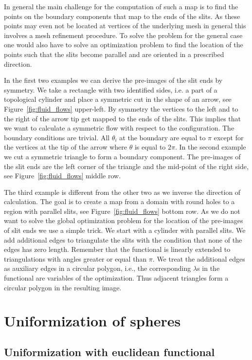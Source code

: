 \documentclass[Thesis.tex]{subfiles}
\begin{document}
In general the main challenge for the computation of such a map is to find the points on the boundary components that map to the ends of the slits. As these points may even not be located at vertices of the underlying mesh in general this involves a mesh refinement procedure. To solve the problem for the general case one would also have to solve an optimization problem to find the location of the points such that the slits become parallel and are oriented in a prescribed direction.

In the first two examples we can derive the pre-images of the slit ends by symmetry. 
We take a rectangle with two identified sides, i.e. a part of a topological cylinder and place a symmetric cut in the shape of an arrow, see Figure~\ref{fig:fluid_flows} upper-left. 
By symmetry the vertices to the left and to the right of the arrow tip get mapped to the ends of the slits. 
This implies that we want to calculate a symmetric flow with respect to the configuration.
The boundary conditions are trivial. 
All $\theta_i$ at the boundary are equal to $\pi$ except for the vertices at the tip of the arrow where $\theta$ is equal to $2\pi$.
In the second example we cut a symmetric triangle to form a boundary component. The pre-images of the slit ends are the left corner of the triangle and the mid-point of the right side, see Figure~\ref{fig:fluid_flows} middle row.

The third example is different from the other two as we inverse the direction of calculation. 
The goal is to create a map from a domain with round holes to a region with parallel slits, see Figure~\ref{fig:fluid_flows} bottom row. 
As we do not want to solve the global optimization problem for the location of the pre-images of slit ends we use a simple trick.
We start with a cylinder with parallel slits.
We add additional edges to triangulate the slits with the condition that none of the edges has zero length.
Remember that the functional is linearly extended to triangulations with angles greater or equal than $\pi$.
We treat the additional edges as auxiliary edges in a circular polygon, i.e., the corresponding $\lambda$s in the functional are variables of the optimization. 
Thus adjacent triangles form a circular polygon in the resulting image.

\section{Uniformization of spheres}
\subsection{Uniformization with euclidean functional}
\end{document}
